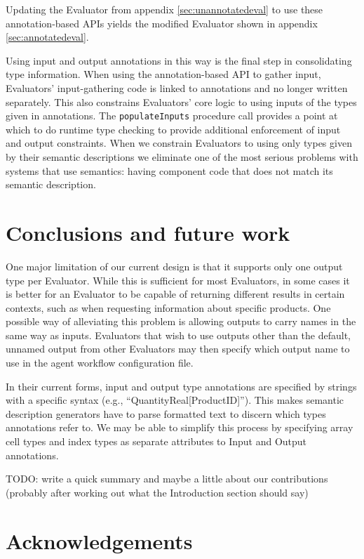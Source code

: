 \documentclass{article}
\begin{document}
Updating the Evaluator from appendix \ref{sec:unannotatedeval} to use these annotation-based APIs yields the modified Evaluator shown in appendix \ref{sec:annotatedeval}.

Using input and output annotations in this way is the final step in consolidating type information.
When using the annotation-based API to gather input, Evaluators' input-gathering code is linked to annotations and no longer written separately.
This also constrains Evaluators' core logic to using inputs of the types given in annotations.
The \texttt{populateInputs} procedure call provides a point at which to do runtime type checking to provide additional enforcement of input and output constraints.
When we constrain Evaluators to using only types given by their semantic descriptions we eliminate one of the most serious problems with systems that use semantics:  having component code that does not match its semantic description.

\section{Conclusions and future work}

One major limitation of our current design is that it supports only one output type per Evaluator.
While this is sufficient for most Evaluators, in some cases it is better for an Evaluator to be capable of returning different results in certain contexts, such as when requesting information about specific products.
One possible way of alleviating this problem is allowing outputs to carry names in the same way as inputs.
Evaluators that wish to use outputs other than the default, unnamed output from other Evaluators may then specify which output name to use in the agent workflow configuration file.

In their current forms, input and output type annotations are specified by strings with a specific syntax (e.g., ``QuantityReal[ProductID]'').
This makes semantic description generators have to parse formatted text to discern which types annotations refer to.
We may be able to simplify this process by specifying array cell types and index types as separate attributes to Input and Output annotations.

TODO:  write a quick summary and maybe a little about our contributions (probably after working out what the Introduction section should say)

\section*{Acknowledgements}
\end{document}
